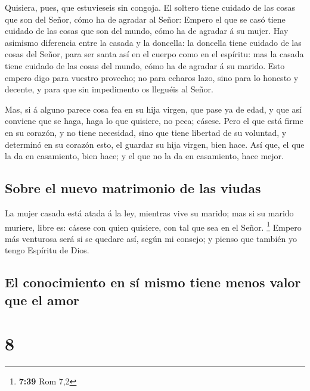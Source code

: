  Quisiera, pues, que estuvieseis sin congoja. El soltero
tiene cuidado de las cosas que son del Señor, cómo ha de agradar al
Señor:  Empero el que se casó tiene cuidado de las cosas
que son del mundo, cómo ha de agradar á su mujer.  Hay
asimismo diferencia entre la casada y la doncella: la doncella tiene
cuidado de las cosas del Señor, para ser santa así en el cuerpo como en
el espíritu: mas la casada tiene cuidado de las cosas del mundo, cómo ha
de agradar á su marido.  Esto empero digo para vuestro
provecho; no para echaros lazo, sino para lo honesto y decente, y para
que sin impedimento os lleguéis al Señor.

 Mas, si á alguno parece cosa fea en su hija virgen, que
pase ya de edad, y que así conviene que se haga, haga lo que quisiere,
no peca; cásese.  Pero el que está firme en su corazón, y
no tiene necesidad, sino que tiene libertad de su voluntad, y determinó
en su corazón esto, el guardar su hija virgen, bien hace.
 Así que, el que la da en casamiento, bien hace; y el que
no la da en casamiento, hace mejor.

\hypertarget{sobre-el-nuevo-matrimonio-de-las-viudas}{%
\subsection{Sobre el nuevo matrimonio de las
viudas}\label{sobre-el-nuevo-matrimonio-de-las-viudas}}

 La mujer casada está atada á la ley, mientras vive su
marido; mas si su marido muriere, libre es: cásese con quien quisiere,
con tal que sea en el Señor. \footnote{\textbf{7:39} Rom 7,2}
 Empero más venturosa será si se quedare así, según mi
consejo; y pienso que también yo tengo Espíritu de Dios.

\hypertarget{el-conocimiento-en-suxed-mismo-tiene-menos-valor-que-el-amor}{%
\subsection{El conocimiento en sí mismo tiene menos valor que el
amor}\label{el-conocimiento-en-suxed-mismo-tiene-menos-valor-que-el-amor}}

\hypertarget{section-7}{%
\section{8}\label{section-7}}

